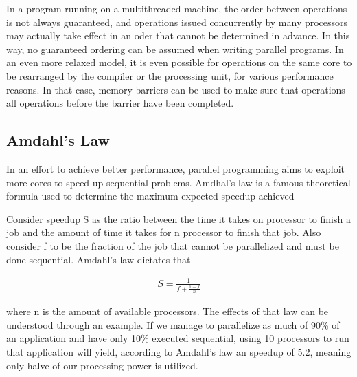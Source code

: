 In a program running on a multithreaded machine, the order between operations is not always guaranteed, and operations issued concurrently by many processors may actually take effect in an oder that cannot be determined in advance. In this way, no guaranteed ordering can be assumed when writing parallel programs. In an even more relaxed model, it is even possible for operations on the same core to be rearranged by the compiler or the processing unit, for various performance reasons. In that case, memory barriers can be used to make sure that operations all operations before the barrier have been completed.

\subsection{Amdahl's Law}

In an effort to achieve better performance, parallel programming aims to exploit more cores to speed-up sequential problems. Amdhal's law is a famous theoretical formula used to determine the maximum expected speedup achieved

Consider speedup S as the ratio between the time it takes on processor to finish a job and the amount of time it takes for n processor to finish that job. Also consider f to be the fraction of the job  that cannot be parallelized and must be done sequential. Amdahl's law dictates that 

\begin{align*}
	S = \frac{1}{f + \frac{1-f}{n}}
\end{align*}

where n is the amount of available processors. The effects of that law can be understood through an example. If we manage to parallelize as much of 90\% of an application and have only 10\% executed sequential, using 10 processors to run that application will yield, according to Amdahl's law an speedup of 5.2, meaning only halve of our processing power is utilized. 

